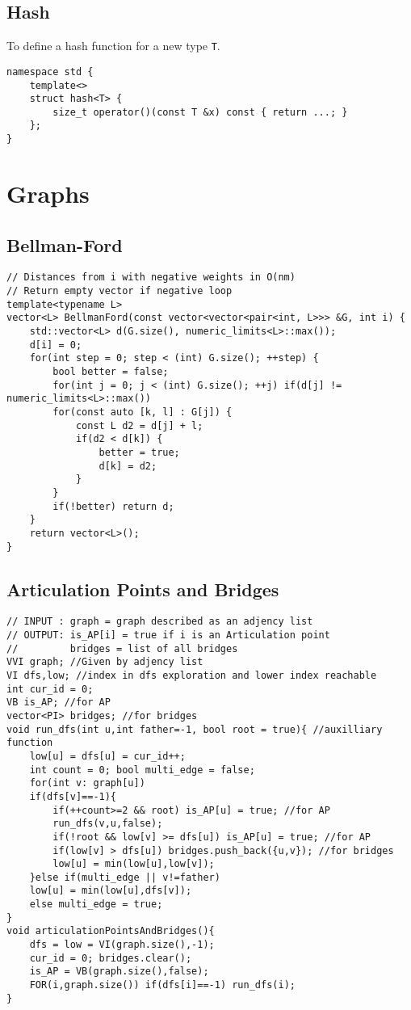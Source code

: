 \documentclass[a4paper,9pt]{article}
\begin{document}
\subsection{Hash}

To define a hash function for a new type \verb|T|.
\begin{lstlisting}
namespace std {
	template<>
	struct hash<T> {
		size_t operator()(const T &x) const { return ...; }
	};
}
\end{lstlisting}
	
\section{Graphs}
	
\subsection{Bellman-Ford}

\begin{lstlisting}
// Distances from i with negative weights in O(nm)
// Return empty vector if negative loop
template<typename L>
vector<L> BellmanFord(const vector<vector<pair<int, L>>> &G, int i) {
	std::vector<L> d(G.size(), numeric_limits<L>::max());
	d[i] = 0;
	for(int step = 0; step < (int) G.size(); ++step) {
		bool better = false;
		for(int j = 0; j < (int) G.size(); ++j) if(d[j] != numeric_limits<L>::max())
		for(const auto [k, l] : G[j]) {
			const L d2 = d[j] + l;
			if(d2 < d[k]) {
				better = true;
				d[k] = d2;
			}
		}
		if(!better) return d;
	}
	return vector<L>();
}
\end{lstlisting}

\subsection{Articulation Points and Bridges}

\begin{lstlisting}
// INPUT : graph = graph described as an adjency list
// OUTPUT: is_AP[i] = true if i is an Articulation point
//         bridges = list of all bridges
VVI graph; //Given by adjency list
VI dfs,low; //index in dfs exploration and lower index reachable
int cur_id = 0;
VB is_AP; //for AP
vector<PI> bridges; //for bridges
void run_dfs(int u,int father=-1, bool root = true){ //auxilliary function
	low[u] = dfs[u] = cur_id++;
	int count = 0; bool multi_edge = false;
	for(int v: graph[u])
	if(dfs[v]==-1){
		if(++count>=2 && root) is_AP[u] = true; //for AP
		run_dfs(v,u,false);
		if(!root && low[v] >= dfs[u]) is_AP[u] = true; //for AP
		if(low[v] > dfs[u]) bridges.push_back({u,v}); //for bridges
		low[u] = min(low[u],low[v]);
	}else if(multi_edge || v!=father)
	low[u] = min(low[u],dfs[v]);
	else multi_edge = true;
}
void articulationPointsAndBridges(){
	dfs = low = VI(graph.size(),-1);
	cur_id = 0; bridges.clear();
	is_AP = VB(graph.size(),false);
	FOR(i,graph.size()) if(dfs[i]==-1) run_dfs(i);
}
\end{lstlisting}
\end{document}
